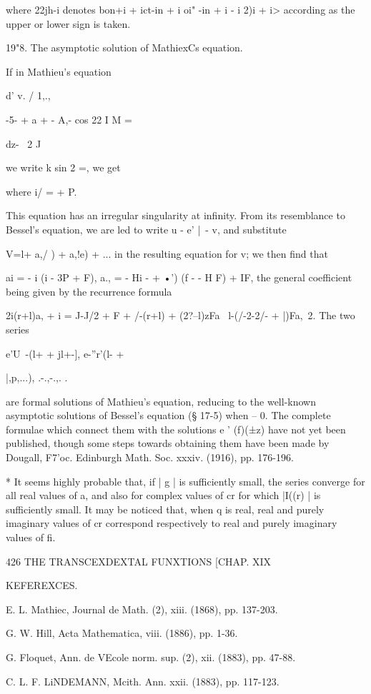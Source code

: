 {{where 22jh-i denotes bon+i + ict-in + i oi" -in + i - i 2)i + i>
according as the upper or lower sign is taken.

19"8. The asymptotic solution of MathiexCs equation.

If in Mathieu's equation

d' v. / 1,., \

-5- + a + - A,- cos 22 I M =

dz- \ 2 J

we write k sin 2 =, we get

where i/ = + P.

This equation has an irregular singularity at infinity. From its
resemblance to Bessel's equation, we are led to write u - e' |~- v,
and substitute

V=l+ a,/ ) + a,!e) + ... in the resulting equation for v; we then
find that

ai = - i (i - 3P + F), a., = - Hi - + •') (f - - H F) + IF, the
general coefficient being given by the recurrence formula

2i(r+l)a, + i = J-J/2 + F + /-(r+l) + (2?--l)zFa \ l-(/-2-2/- + |)Fa,\
2. The two series

e'U~-(l+ + jl+-], e-''r'(l- +

|,p,...), .-.,-.,. . \

are formal solutions of Mathieu's equation, reducing to the well-known
asymptotic solutions of Bessel's equation (§ 17-5) when -- 0. The
complete formulae which connect them with the solutions e ' (f)(±z)
have not yet been published, though some steps towards obtaining them
have been made by Dougall, F7'oc. Edinburgh Math. Soc. xxxiv. (1916),
pp. 176-196.

* It seems highly probable that, if | g | is sufficiently small, the
series converge for all real values of a, and also for complex values
of cr for which |I((r) | is sufficiently small. It may be noticed
that, when q is real, real and purely imaginary values of cr
correspond respectively to real and purely imaginary values of fi.

426 THE TRANSCEXDEXTAL FUNXTIONS [CHAP. XIX

KEFEREXCES.

E. L. Mathiec, Journal de Math. (2), xiii. (1868), pp. 137-203.

G. W. Hill, Acta Mathematica, viii. (1886), pp. 1-36.

G. Floquet, Ann. de VEcole norm. sup. (2), xii. (1883), pp. 47-88.

C. L. F. LiNDEMANN, Mcith. Ann. xxii. (1883), pp. 117-123.

}}
